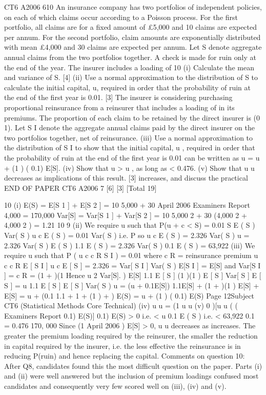 CT6 A2006 610
An insurance company has two portfolios of independent policies, on each of which
claims occur according to a Poisson process. For the first portfolio, all claims are for
a fixed amount of £5,000 and 10 claims are expected per annum. For the second
portfolio, claim amounts are exponentially distributed with mean £4,000 and 30
claims are expected per annum.
Let S denote aggregate annual claims from the two portfolios together.
A check is made for ruin only at the end of the year.
The insurer includes a loading of 10%
(i) Calculate the mean and variance of S.
[4]
(ii) Use a normal approximation to the distribution of S to calculate the initial
capital, u, required in order that the probability of ruin at the end of the first
year is 0.01.
[3]
The insurer is considering purchasing proportional reinsurance from a reinsurer that
includes a loading of in its premiums. The proportion of each claim to be retained
by the direct insurer is (0
1).
Let S I denote the aggregate annual claims paid by the direct insurer on the two
portfolios together, net of reinsurance.
(iii)
Use a normal approximation to the distribution of S I to show that the initial
capital, u , required in order that the probability of ruin at the end of the first
year is 0.01 can be written as
u = u + (1
) (
0.1) E[S].
(iv) Show that u > u , as long as < 0.476.
(v) Show that u u decreases as
implications of this result.
[3]
increases, and discuss the practical
END OF PAPER
CT6 A2006 7
[6]
[3]
[Total 19]


10
(i)
E(S) = E[S 1 ] + E[S 2 ]
= 10 5,000 + 30
April 2006
Examiners Report
4,000 = 170,000
Var[S] = Var[S 1 ] + Var[S 2 ]
= 10 5,000 2 + 30 (4,000 2 + 4,000 2 )
= 1.21 10 9
(ii)
We require u such that
P(u + c < S) = 0.01
S E ( S )
Var( S )
u c E ( S )
= 0.01
Var( S )
i.e. P
so u c E ( S )
= 2.326
Var( S )
u = 2.326 Var( S )
E ( S ) 1.1 E ( S )
= 2.326 Var( S ) 0.1 E ( S )
= 63,922
(iii)
We require u such that
P ( u
c c R
S I ) = 0.01
where c R = reinsurance premium
u
c c R E [ S I ]
u c E [ S ]
= 2.326 =
Var[ S I ]
Var( S )
E[S I ] = E[S] and Var[S I ] =
c R = (1 + )(1
Hence
u
2 Var[S].
) E[S]
1.1 E [ S ] (1
)(1 ) E [ S ]
Var[ S ]
E [ S ]
=
u 1.1 E [ S ] E [ S ]
Var( S )
u = (u + 0.1E[S]) 1.1E[S] + (1 + )(1
) E[S] + E[S]
= u + (0.1 1.1 + 1
+ (1
) + ) E(S)
= u + (1
) (
0.1) E(S)
Page 12Subject CT6 (Statistical Methods Core Technical)
(iv)
u u = (1
u u
(v)
0
)[u
u
(
(
Examiners Report
0.1) E(S)]
0.1) E(S) > 0
i.e. < u
0.1
E ( S )
i.e. < 63,922
0.1 = 0.476
170, 000
Since (1
April 2006
) E[S] > 0, u
u decreases as increases.
The greater the premium loading required by the reinsurer, the smaller the
reduction in capital required by the insurer, i.e. the less effective the
reinsurance is in reducing P(ruin) and hence replacing the capital.
Comments on question 10: After Q8, candidates found this the most difficult question on the
paper. Parts (i) and (ii) were well answered but the inclusion of premium loadings confused
most candidates and consequently very few scored well on (iii), (iv) and (v).

